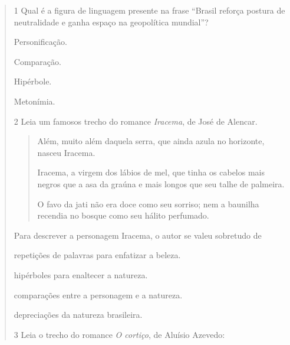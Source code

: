 \begin{quote}
{\num{1} Qual é a figura de linguagem presente na frase ``Brasil reforça postura de 
neutralidade e ganha espaço na geopolítica mundial''?

\begin{escolha}

  \item Personificação.
  
  \item Comparação.
  
  \item Hipérbole.
  
  \item Metonímia. 

\end{escolha}


\num{2} Leia um famosos trecho do romance \textit{Iracema}, de José de Alencar.

\begin{quote}

Além, muito além daquela serra, que ainda azula no
horizonte, nasceu Iracema.

Iracema, a virgem dos lábios de mel, que tinha os
cabelos mais negros que a asa da graúna e mais longos
que seu talhe de palmeira.

O favo da jati não era doce como seu sorriso; nem
a baunilha recendia no bosque como seu hálito perfumado.

\end{quote}


Para descrever a personagem Iracema, o autor se valeu sobretudo de

\begin{escolha}

  \item repetições de palavras para enfatizar a beleza. 

  \item hipérboles para enaltecer a natureza.

  \item comparações entre a personagem e a natureza.

  \item depreciações da natureza brasileira.

\end{escolha}


\num{3} Leia o trecho do romance \textit{O cortiço}, de Aluísio Azevedo:

}
\end{quote}
